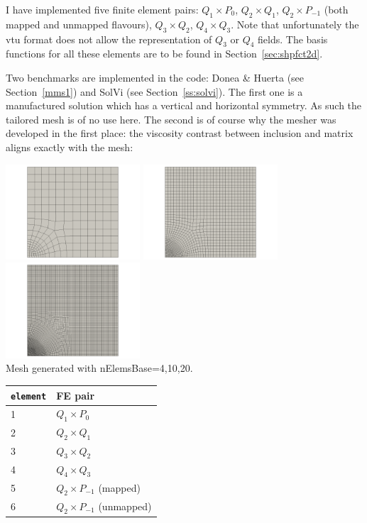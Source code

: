 I have implemented five finite element pairs: $Q_1\times P_0$, $Q_2\times Q_1$, $Q_2 \times P_{-1}$
(both mapped and unmapped flavours), $Q_3\times Q_2$, $Q_4\times Q_3$. 
Note that unfortunately the vtu format does not allow the representation of $Q_3$ or $Q_4$ fields. 
The basis functions for all these elements are to be found in Section~\ref{sec:shpfct2d}.

Two benchmarks are implemented in the code: Donea \& Huerta (see Section~\ref{mms1}) and 
SolVi (see Section~\ref{ss:solvi}).
The first one is a manufactured solution which has a vertical and horizontal symmetry. 
As such the tailored mesh is of no use here. The second is of course why the mesher 
was developed in the first place: the viscosity contrast between 
inclusion and matrix aligns exactly with the mesh:

\begin{center}
\includegraphics[width=5cm]{python_codes/fieldstone_117/images/mesh04}
\includegraphics[width=5cm]{python_codes/fieldstone_117/images/mesh10}
\includegraphics[width=5cm]{python_codes/fieldstone_117/images/mesh20}\\
{\captionfont Mesh generated with nElemsBase=4,10,20.}
\end{center}

\begin{center}
\begin{tabular}{ll}
\hline
{\tt element} & FE pair \\
\hline
\hline
1& $Q_1 \times P_0$ \\
2& $Q_2 \times Q_1$ \\
3& $Q_3 \times Q_2$ \\
4& $Q_4 \times Q_3$ \\
5& $Q_2 \times P_{-1}$ (mapped)\\
6& $Q_2 \times P_{-1}$ (unmapped)\\
\hline
\end{tabular}
\end{center}

